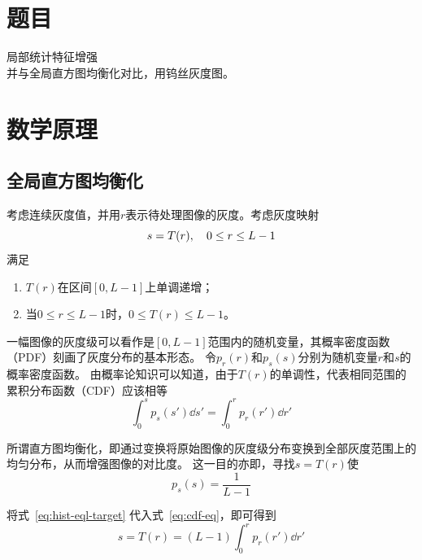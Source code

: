 \documentclass{hitgsrep}
\begin{document}
\maketitle

\section{题目}

局部统计特征增强\\
并与全局直方图均衡化对比，用钨丝灰度图。

\section{数学原理}

\subsection{全局直方图均衡化}

考虑连续灰度值，并用$r$表示待处理图像的灰度。考虑灰度映射
\begin{equation}
    s=T(r)\qc{0\le r\le L-1}
\end{equation}
满足
\begin{enumerate}
    \item $T(r)$在区间$[0,L-1]$上单调递增；
    \item 当$0\le r\le L-1$时，$0\le T(r)\le L-1$。
\end{enumerate}

一幅图像的灰度级可以看作是$[0,L-1]$范围内的随机变量，其概率密度函数（PDF）刻画了灰度分布的基本形态。
令$p_r(r)$和$p_s(s)$分别为随机变量$r$和$s$的概率密度函数。
由概率论知识可以知道，由于$T(r)$的单调性，代表相同范围的累积分布函数（CDF）应该相等
\begin{equation}\label{eq:cdf-eq}
    \int_{0}^{s}p_s(s')\dd{s'}=\int_{0}^{r}p_r(r')\dd{r'}
\end{equation}

所谓直方图均衡化，即通过变换将原始图像的灰度级分布变换到全部灰度范围上的均匀分布，从而增强图像的对比度。
这一目的亦即，寻找$s=T(r)$使
\begin{equation}\label{eq:hist-eql-target}
    p_s(s)=\frac{1}{L-1}
\end{equation}

将式~\eqref{eq:hist-eql-target} 代入式~\eqref{eq:cdf-eq}，即可得到
\begin{equation}\label{eq:hist-eql-cont}
    s=T(r)=(L-1)\int_0^r p_r(r')\dd{r'}
\end{equation}
\end{document}
